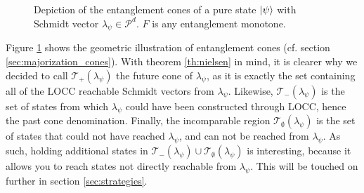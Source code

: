\begin{figure}[h!]
    \centering
    \caption{Depiction of the entanglement cones of a pure state $\ket{\psi}$ with Schmidt vector $\lambda_\psi \in \mathcal{P}^d$. $F$ is any entanglement monotone.}
    \label{fig:nielsen_cones_example}
\end{figure}

Figure \ref{fig:nielsen_cones_example} shows the geometric illustration of entanglement cones (cf. section \ref{sec:majorization_cones}). With theorem \ref{th:nielsen} in mind, it is clearer why we decided to call $\mathcal{T}_+ (\lambda_\psi)$ the future cone of $\lambda_\psi$, as it is exactly the set containing all of the LOCC reachable Schmidt vectors from $\lambda_\psi$. Likewise, $\mathcal{T}_- (\lambda_\psi)$ is the set of states from which $\lambda_\psi$ could have been constructed through LOCC, hence the past cone denomination. Finally, the incomparable region $\mathcal{T}_\emptyset (\lambda_\psi)$ is the set of states that could not have reached $\lambda_\psi$, and can not be reached from $\lambda_\psi$.  As such, holding additional states in $\mathcal{T}_- (\lambda_\psi) \cup \mathcal{T}_\emptyset (\lambda_\psi)$ is interesting, because it allows you to reach states not directly reachable from $\lambda_\psi$. This will be touched on further in section \ref{sec:strategies}. 

